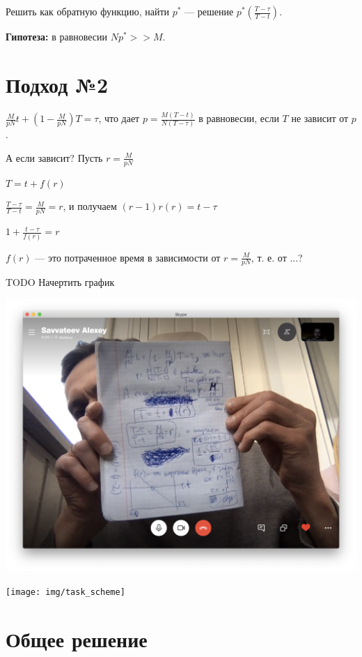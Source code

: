 Решить как обратную функцию, найти $p^*$ — решение $p^*(\frac{T-\tau}{T-t})$.

\textbf{Гипотеза:} в равновесии $Np^* >> M$.


\section{Подход №2}



$\frac{M}{pN} t + (1 - \frac{M}{pN}) T = \tau$,
что дает
$p=\frac{M(T-t)}{N(T-\tau)}$ в равновесии, если $T$ не зависит от $p$.

А если зависит? Пусть $r = \frac{M}{pN}$

$T = t + f(r)$

$\frac{T-\tau}{T-t} = \frac{M}{pN} = r$, и получаем $(r-1)r(r) = t - \tau$

$1 + \frac{t-\tau}{f(r)} = r$

$f(r)$ --- это потраченное время в зависимости от $r = \frac{M}{pN}$, т. е. от ...?

TODO Начертить график

\includegraphics[scale=0.4]{img/tetrad2}

\bigskip

\texttt{[image: img/task\_scheme]}


\section{Общее решение}


